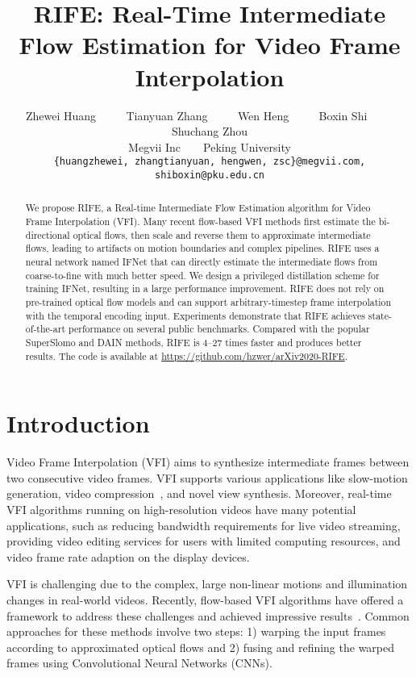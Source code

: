 \documentclass[final]{cvpr}
\begin{document}
    \title{RIFE: Real-Time Intermediate Flow Estimation for Video Frame Interpolation}

    \author{Zhewei Huang
		~~~~
		Tianyuan Zhang
		~~~~
		Wen Heng
		~~~~
		Boxin Shi
		~~~~
		Shuchang Zhou\\
		Megvii Inc~~~~Peking University\\
		{\tt\small \{huangzhewei, zhangtianyuan, hengwen, zsc\}@megvii.com, shiboxin@pku.edu.cn}
		}
\maketitle


\begin{abstract}
   We propose RIFE, a Real-time Intermediate Flow Estimation algorithm for Video Frame Interpolation (VFI). Many recent flow-based VFI methods first estimate the bi-directional optical flows, then scale and reverse them to approximate intermediate flows, leading to artifacts on motion boundaries and complex pipelines. RIFE uses a neural network named IFNet that can directly estimate the intermediate flows from coarse-to-fine with much better speed. We design a privileged distillation scheme for training IFNet, resulting in a large performance improvement. RIFE does not rely on pre-trained optical flow models and can support arbitrary-timestep frame interpolation with the temporal encoding input. Experiments demonstrate that RIFE achieves state-of-the-art performance on several public benchmarks. Compared with the popular SuperSlomo and DAIN methods, RIFE is 4--27 times faster and produces better results. The code is available at \url{https://github.com/hzwer/arXiv2020-RIFE}.
\end{abstract}

\section{Introduction}
Video Frame Interpolation (VFI) aims to synthesize intermediate frames between two consecutive video frames. VFI supports various applications like slow-motion generation, video compression~\cite{wu2018video}, and novel view synthesis. Moreover, real-time VFI algorithms running on high-resolution videos have many potential applications, such as reducing bandwidth requirements for live video streaming, providing video editing services for users with limited computing resources, and video frame rate adaption on the display devices.

VFI is challenging due to the complex, large non-linear motions and illumination changes in real-world videos. Recently, flow-based VFI algorithms have offered a framework to address these challenges and achieved impressive results~\cite{liu2017video, jiang2018super, niklaus2018context, xue2019video, bao2019depth, xu2019quadratic, liu2020enhanced}. Common approaches for these methods involve two steps: 1) warping the input frames according to approximated optical flows and 2) fusing and refining the warped frames using Convolutional Neural Networks (CNNs). 
\end{document}
